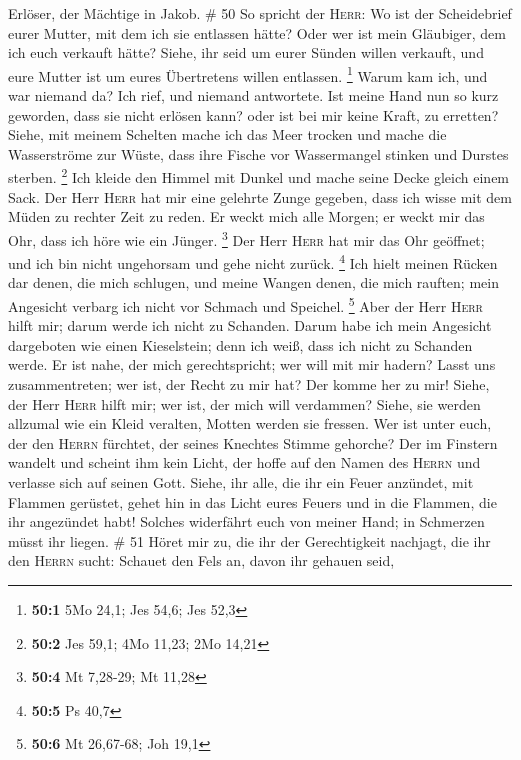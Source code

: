 Erlöser, der Mächtige in Jakob. \# 50  So spricht der
\textsc{Herr}: Wo ist der Scheidebrief eurer Mutter, mit dem ich sie
entlassen hätte? Oder wer ist mein Gläubiger, dem ich euch verkauft
hätte? Siehe, ihr seid um eurer Sünden willen verkauft, und eure Mutter
ist um eures Übertretens willen entlassen. \footnote{\textbf{50:1} 5Mo
  24,1; Jes 54,6; Jes 52,3}  Warum kam ich, und war
niemand da? Ich rief, und niemand antwortete. Ist meine Hand nun so kurz
geworden, dass sie nicht erlösen kann? oder ist bei mir keine Kraft, zu
erretten? Siehe, mit meinem Schelten mache ich das Meer trocken und
mache die Wasserströme zur Wüste, dass ihre Fische vor Wassermangel
stinken und Durstes sterben. \footnote{\textbf{50:2} Jes 59,1; 4Mo
  11,23; 2Mo 14,21}  Ich kleide den Himmel mit Dunkel und
mache seine Decke gleich einem Sack.  Der Herr
\textsc{Herr} hat mir eine gelehrte Zunge gegeben, dass ich wisse mit
dem Müden zu rechter Zeit zu reden. Er weckt mich alle Morgen; er weckt
mir das Ohr, dass ich höre wie ein Jünger. \footnote{\textbf{50:4} Mt
  7,28-29; Mt 11,28}  Der Herr \textsc{Herr} hat mir das
Ohr geöffnet; und ich bin nicht ungehorsam und gehe nicht zurück.
\footnote{\textbf{50:5} Ps 40,7}  Ich hielt meinen Rücken
dar denen, die mich schlugen, und meine Wangen denen, die mich rauften;
mein Angesicht verbarg ich nicht vor Schmach und Speichel. \footnote{\textbf{50:6}
  Mt 26,67-68; Joh 19,1}  Aber der Herr \textsc{Herr}
hilft mir; darum werde ich nicht zu Schanden. Darum habe ich mein
Angesicht dargeboten wie einen Kieselstein; denn ich weiß, dass ich
nicht zu Schanden werde.  Er ist nahe, der mich
gerechtspricht; wer will mit mir hadern? Lasst uns zusammentreten; wer
ist, der Recht zu mir hat? Der komme her zu mir!  Siehe,
der Herr \textsc{Herr} hilft mir; wer ist, der mich will verdammen?
Siehe, sie werden allzumal wie ein Kleid veralten, Motten werden sie
fressen.  Wer ist unter euch, der den \textsc{Herrn}
fürchtet, der seines Knechtes Stimme gehorche? Der im Finstern wandelt
und scheint ihm kein Licht, der hoffe auf den Namen des \textsc{Herrn}
und verlasse sich auf seinen Gott.  Siehe, ihr alle, die
ihr ein Feuer anzündet, mit Flammen gerüstet, gehet hin in das Licht
eures Feuers und in die Flammen, die ihr angezündet habt! Solches
widerfährt euch von meiner Hand; in Schmerzen müsst ihr liegen. \# 51
 Höret mir zu, die ihr der Gerechtigkeit nachjagt, die ihr
den \textsc{Herrn} sucht: Schauet den Fels an, davon ihr gehauen seid,
